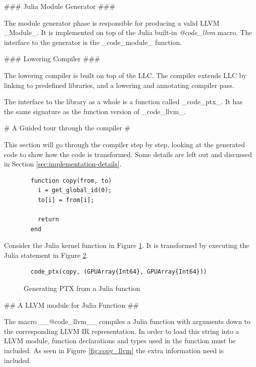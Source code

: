 \begin{markdown}
### Julia Module Generator ###

The module generator phase is responsible for producing a valid LLVM
_Module_. It is implemented on top of the Julia built-in
\textit{@code\_llvm} macro. The interface to the generator is the
_code_module_ function.

### Lowering Compiler ###

The lowering compiler is built on top of the \gls{LLC}. The compiler
extends \gls{LLC} by linking to predefined libraries, and a lowering
and annotating compiler pass.

The interface to the library as a whole is a function called
_code_ptx_. It has the same signature as the function version of
_code_llvm_.

# A Guided tour through the compiler #

This section will go through the compiler step by step, looking at the
generated code to show how the code is transformed. Some details are
left out and discussed in Section \ref{sec:implementation-details}.


\begin{figure}[H]
  \begin{verbatim}
  function copy(from, to)
    i = get_global_id(0);
    to[i] = from[i];
  
    return
  end
  \end{verbatim}
  \caption{}
  \label{fig:julia-copy}
\end{figure}

Consider the Julia kernel function in Figure \ref{fig:julia-copy}. It
is transformed by executing the Julia statement in Figure
\ref{fig:impl:code_ptx}.

\begin{figure}[H]
  \begin{verbatim}
  code_ptx(copy, (GPUArray{Int64}, GPUArray{Int64}))
  \end{verbatim}
  \caption{Generating PTX from a Julia function}
  \label{fig:impl:code_ptx}
\end{figure}


## A LLVM module for Julia Function ##

The macro __@code\_llvm__ compiles a Julia function with arguments
down to the corresponding LLVM IR representation. In order to load
this string into a LLVM module, function declarations and types used
in the function must be included. As seen in Figure
\ref{fig:copy_llvm} the extra information need is included. 


\end{markdown}

